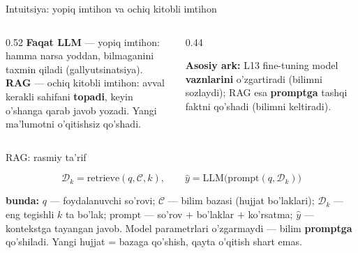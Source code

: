 \documentclass[aspectratio=169,11pt]{beamer}
\newcommand{\bunda}[1]{{\small\textbf{bunda:}\; #1}}
\begin{document}
\begin{frame}{Intuitsiya: yopiq imtihon va ochiq kitobli imtihon}
  \begin{columns}[T]
    \begin{column}{0.52\textwidth}
      \small
      \textbf{Faqat LLM} --- yopiq imtihon: hamma narsa yoddan, bilmaganini
      taxmin qiladi (gallyutsinatsiya).\\[5pt]
      \textbf{RAG} --- ochiq kitobli imtihon: avval kerakli sahifani
      \textbf{topadi}, keyin o'shanga qarab javob yozadi. Yangi ma'lumotni
      o'qitishsiz qo'shadi.
    \end{column}
    \begin{column}{0.44\textwidth}
      \begin{tcolorbox}[okbox,top=2pt,bottom=2pt]
        \footnotesize
        \textbf{Asosiy ark:} L13 fine-tuning model \textbf{vaznlarini}
        o'zgartiradi (bilimni sozlaydi); RAG esa \textbf{promptga} tashqi
        faktni qo'shadi (bilimni keltiradi).
      \end{tcolorbox}
    \end{column}
  \end{columns}
\end{frame}

\begin{frame}{RAG: rasmiy ta'rif}
  \begin{tcolorbox}[defbox,title={Ta'rif: Retrieval-Augmented Generation}]
    \vspace{-0.4em}
    $$ \mathcal{D}_k = \mathrm{retrieve}(q, \mathcal{C}, k), \qquad
       \hat{y} = \mathrm{LLM}\big(\mathrm{prompt}(q, \mathcal{D}_k)\big) $$
  \end{tcolorbox}
  \vspace{2pt}
  \bunda{$q$ --- foydalanuvchi so'rovi; $\mathcal{C}$ --- bilim bazasi (hujjat
  bo'laklari); $\mathcal{D}_k$ --- eng tegishli $k$ ta bo'lak; $\mathrm{prompt}$
  --- so'rov $+$ bo'laklar $+$ ko'rsatma; $\hat{y}$ --- kontekstga tayangan javob.}
  \vspace{4pt}
  \footnotesize Model parametrlari o'zgarmaydi --- bilim \textbf{promptga}
  qo'shiladi. Yangi hujjat = bazaga qo'shish, qayta o'qitish shart emas.
\end{frame}
\end{document}
